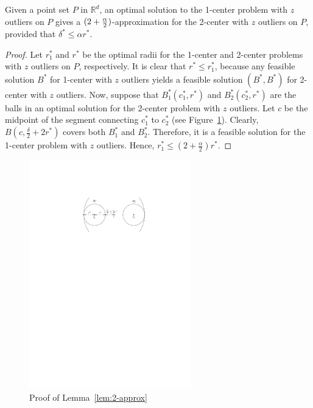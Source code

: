 \documentclass[envcountsame]{cls/cccg15}
\newcommand{\IR}{\ensuremath{\mathbb{R}}}
\newcommand{\lee}{\leqslant}
\renewcommand{\le}{\lee}
\begin{document}
\begin{lemma}
\label{lem:2-approx}
	Given a point set $P$ in $\IR^d$,
	an optimal solution to the 1-center problem with $z$ outliers on $P$
	gives a $(2 + {\alpha \over 2})$-approximation for
	the 2-center with $z$ outliers on $P$,
	provided that $\delta^* \le \alpha r^*$.
\end{lemma}


\begin{proof}
Let $r_1^*$ and $r^*$ be the optimal radii for
the 1-center and 2-center problems with $z$ outliers on $P$, respectively.
It is clear that $r^* \le r_1^*$,
because any feasible solution $B^*$ for 1-center with $z$ outliers
yields a feasible solution $(B^*, B^*)$ for 2-center with $z$ outliers.
Now, suppose that $B_1^*(c_1^*, r^*)$ and $B_2^*(c_2^*, r^*)$
are the balls in an optimal solution for the 2-center problem with $z$ outliers.
Let $c$ be the midpoint of the segment connecting 
$c_1^*$ to $c_2^*$ (see Figure~\ref{fig:2lt1}).
Clearly, $B\left(c, \frac{\delta}{2} + 2r^*\right)$ covers both $B_1^*$ and $B_2^*$. 
Therefore, it is a feasible solution for the 1-center problem with $z$ outliers.
Hence, $ r_1^* \le \left(2 + \frac{\alpha}{2}\right) r^*$.
\end{proof}

\begin{figure}[t]
	\centering
	\includegraphics[width=19em]{figs/2lt1}
	\caption{Proof of Lemma~\ref{lem:2-approx}}
	\label{fig:2lt1}
\end{figure}
\end{document}
